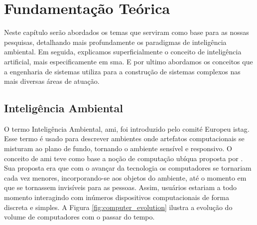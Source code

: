\chapter{Fundamentação Teórica}
\label{cap:fundamentacao-teorica}

    Neste capítulo serão abordados os temas que serviram como base para as nossas pesquisas, detalhando mais profundamente os paradigmas de inteligência ambiental. Em seguida, explicamos superficialmente o conceito de inteligência artificial, mais especificamente em \acrlong{sma}. E por ultimo abordamos os conceitos que a engenharia de sistemas utiliza para a construção de sistemas complexos nas mais diversas áreas de atuação.

\section{Inteligência Ambiental}
\label{sec:inteligência-Ambiental}

    O termo Inteligência Ambiental, \acrshort{ami}, foi introduzido  pelo comité Europeu \acrfull{istag}. Esse termo é usado para descrever ambientes onde artefatos computacionais se misturam ao plano de fundo, tornando o ambiente sensível e responsivo. O conceito de \acrshort{ami} teve como base a noção de  computação ubíqua proposta por . Sua proposta era que com o avançar da tecnologia os computadores se tornariam cada vez menores, incorporando-se aos objetos do ambiente, até o momento em que se tornassem invisíveis para as pessoas. Assim, usuários estariam a todo momento interagindo com inúmeros dispositivos computacionais de forma discreta e simples.  A Figura \ref{fig:computer_evolution} ilustra a evolução do volume de computadores com o passar do tempo.
    
    \begin{figure}[ht!]
        \centering
    \end{figure}
    
